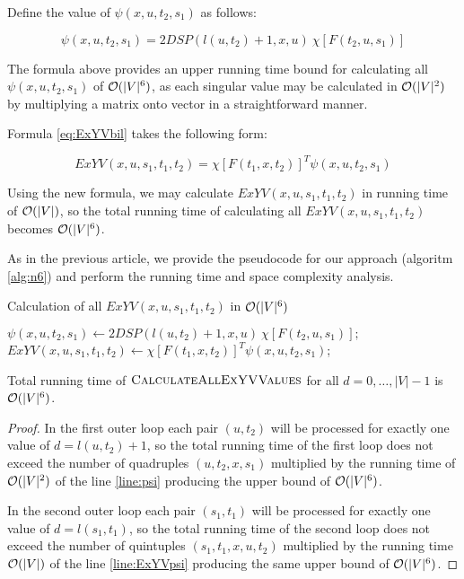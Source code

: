 Define the value of $\psi(x, u, t_2, s_1)$ as follows:

\begin{equation}
\psi(x, u, t_2, s_1) = 2DSP(l(u, t_2) + 1, x, u)~\chi[F(t_2, u, s_1)] \label{eq:psi}
\end{equation}

The formula above provides an upper running time bound for calculating all $\psi(x, u, t_2, s_1)$ of $\mathcal{O}(|V|^6)$, as each singular value may be calculated in $\mathcal{O}(|V|^2)$ by multiplying a matrix onto vector in a straightforward manner. 

Formula \eqref{eq:ExYVbil} takes the following form:

\begin{equation}
ExYV(x, u, s_1, t_1, t_2) = \chi[F(t_1, x, t_2)]^T \psi(x, u, t_2, s_1) \label{eq:ExYVpsi}
\end{equation}

Using the new formula, we may calculate $ExYV(x, u, s_1, t_1, t_2)$ in running time of $\mathcal{O}(|V|)$, so the total running time of calculating all $ExYV(x, u, s_1, t_1, t_2)$ becomes $\mathcal{O}(|V|^6)$.

As in the previous article, we provide the pseudocode for our approach (algoritm \ref{alg:n6}) and perform the running time and space complexity analysis.

\begin{algorithm}
\caption{Calculation of all $ExYV(x, u, s_1, t_1, t_2)$ in $\mathcal{O}(|V|^6)$} \label{alg:n6}
\begin{algorithmic}[1]
            \State $\psi(x, u, t_2, s_1) \gets 2DSP(l(u, t_2) + 1, x, u)~\chi[F(t_2, u, s_1)]; \label{line:psi}$
        \EndFor
    \EndFor
                \State $ExYV(x, u, s_1, t_1, t_2) \gets \chi[F(t_1, x, t_2)]^T \psi(x, u, t_2, s_1)$; \label{line:ExYVpsi}
            \EndFor
        \EndFor
    \EndFor
\EndProcedure
\end{algorithmic}
\end{algorithm}

\begin{proposition}
Total running time of $\textsc{CalculateAllExYVValues}$ for all $d = 0, \ldots, |V|-1$ is $\mathcal{O}(|V|^6)$. 
\end{proposition}
\begin{proof}
In the first outer loop each pair $(u, t_2)$ will be processed for exactly one value of $d = l(u, t_2) + 1$, so the total running time of the first loop does not exceed the number of quadruples $(u, t_2, x, s_1)$ multiplied by the running time of $\mathcal{O}(|V|^2)$ of the line \ref{line:psi} producing the upper bound of $\mathcal{O}(|V|^6)$.

In the second outer loop each pair $(s_1, t_1)$ will be processed for exactly one value of $d = l(s_1, t_1)$, so the total running time of the second loop does not exceed the number of quintuples $(s_1, t_1, x, u, t_2)$ multiplied by the running time $\mathcal{O}(|V|)$ of the line \ref{line:ExYVpsi} producing the same upper bound of $\mathcal{O}(|V|^6)$.
\end{proof}

